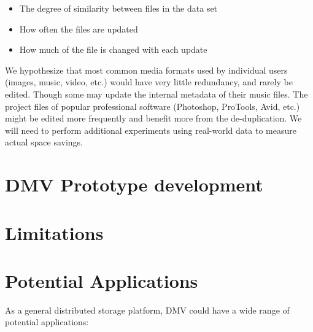 \begin{itemize}

    \item The degree of similarity between files in the data set

    \item How often the files are updated

    \item How much of the file is changed with each update

\end{itemize}

We hypothesize that most common media formats used by individual users (images,
music, video, etc.) would have very little redundancy, and rarely be edited.
Though some may update the internal metadata of their music files. The project
files of popular professional software (Photoshop, ProTools, Avid, etc.) might
be edited more frequently and benefit more from the de-duplication. We will need
to perform additional experiments using real-world data to measure actual space
savings.

%


\section{DMV Prototype development}




%


\section{Limitations}



%


\section{Potential Applications}

As a general distributed storage platform, \gls{DMV} could have a wide range of
potential applications:

